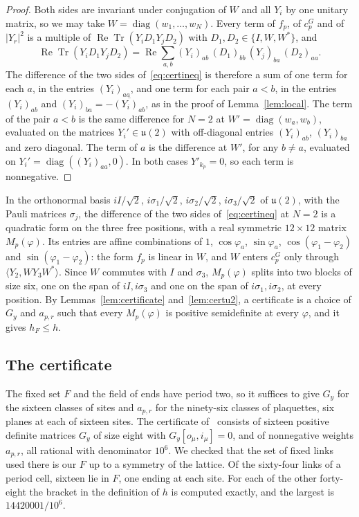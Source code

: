 \documentclass[11pt]{amsart}
\theoremstyle{definition}
\theoremstyle{remark}
\numberwithin{equation}{section}
\newcommand{\ReTr}{\operatorname{Re}\operatorname{Tr}}
\newcommand{\ip}[2]{\langle #1,#2\rangle}
\begin{document}
\begin{proof}
Both sides are invariant under conjugation of $W$ and all $Y_i$ by one
unitary matrix, so we may take $W=\operatorname{diag}(w_1,\dots,w_N)$. Every
term of $f_p$, of $c^G_p$ and of $|Y_r|^2$ is a multiple of
$\ReTr(Y_iD_1Y_jD_2)$ with $D_1,D_2\in\{I,W,W^*\}$, and
\[
\ReTr(Y_iD_1Y_jD_2)=\operatorname{Re}\sum_{a,b}(Y_i)_{ab}\,(D_1)_{bb}\,
(Y_j)_{ba}\,(D_2)_{aa}.
\]
The difference of the two sides of~\eqref{eq:certineq} is therefore a sum
of one term for each $a$, in the entries $(Y_i)_{aa}$, and one term for
each pair $a<b$, in the entries $(Y_i)_{ab}$ and $(Y_i)_{ba}=
-\overline{(Y_i)_{ab}}$, as in the proof of Lemma~\ref{lem:local}. The term
of the pair $a<b$ is the same difference for $N=2$ at
$W'=\operatorname{diag}(w_a,w_b)$, evaluated on the matrices $Y_i'\in
\mathfrak u(2)$ with off-diagonal entries $(Y_i)_{ab}$, $(Y_i)_{ba}$ and
zero diagonal. The term of $a$ is the difference at $W'$, for any $b\ne a$,
evaluated on $Y_i'=\operatorname{diag}((Y_i)_{aa},0)$. In both cases
$Y'_{k_p}=0$, so each term is nonnegative.
\end{proof}

In the orthonormal basis $iI/\sqrt2$, $i\sigma_1/\sqrt2$,
$i\sigma_2/\sqrt2$, $i\sigma_3/\sqrt2$ of $\mathfrak u(2)$, with the Pauli
matrices $\sigma_j$, the difference of the two sides
of~\eqref{eq:certineq} at $N=2$ is a quadratic form on the three free
positions, with a real symmetric $12\times12$ matrix $M_p(\varphi)$. Its
entries are affine combinations of $1$, $\cos\varphi_a$, $\sin\varphi_a$,
$\cos(\varphi_1-\varphi_2)$ and $\sin(\varphi_1-\varphi_2)$: the form $f_p$
is linear in $W$, and $W$ enters $c^G_p$ only through
$\ip{Y_2}{WY_3W^*}$. Since $W$ commutes with $I$ and $\sigma_3$,
$M_p(\varphi)$ splits into two blocks of size six, one on the span of
$iI,i\sigma_3$ and one on the span of $i\sigma_1,i\sigma_2$, at every
position. By Lemmas~\ref{lem:certificate} and~\ref{lem:certu2}, a
certificate is a choice of $G_y$ and $a_{p,r}$ such that every
$M_p(\varphi)$ is positive semidefinite at every $\varphi$, and it gives
$h_F\le h$.

\subsection{The certificate}

The fixed set $F$ and the field of ends have period two, so it suffices to
give $G_y$ for the sixteen classes of sites and $a_{p,r}$ for the
ninety-six classes of plaquettes, six planes at each of sixteen sites. The
certificate of~\cite{Rom26} consists of sixteen positive definite matrices
$G_y$ of size eight with $G_y[o_\mu,i_\mu]=0$, and of nonnegative weights
$a_{p,r}$, all rational with denominator $10^6$. We checked that the set of fixed
links used there is our $F$ up to a symmetry of the lattice. Of the sixty-four links of
a period cell, sixteen lie in $F$, one ending at each site. For each of
the other forty-eight the bracket in the definition of $h$ is computed
exactly, and the largest is $14420001/10^6$.
\end{document}

